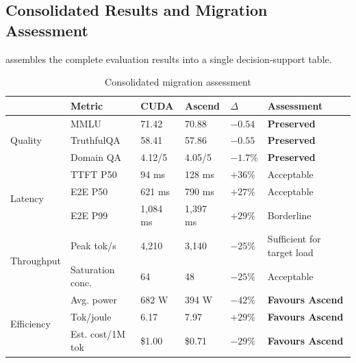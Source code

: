 \subsection{Consolidated Results and Migration Assessment}
\label{subsec:consolidated-results}


 assembles the complete evaluation
results into a single decision-support table.

\begin{table}[htbp]
  \centering
  \caption{Consolidated migration assessment}
  \label{tab:consolidated-verdict}
  \begin{tabularx}{\textwidth}{llXXlX}
    \toprule
    \tableheader{Dimension & Metric & CUDA & Ascend & $\Delta$ & Assessment} \\
    \midrule
    \multirow{3}{*}{Quality}
      & MMLU & 71.42 & 70.88 & $-0.54$ & \textcolor{SecondaryRed}{\bfseries Preserved} \\
      & TruthfulQA & 58.41 & 57.86 & $-0.55$ & \textcolor{SecondaryRed}{\bfseries Preserved} \\
      & Domain QA & 4.12/5 & 4.05/5 & $-1.7\%$ & \textcolor{SecondaryRed}{\bfseries Preserved} \\
    \midrule
    \multirow{3}{*}{Latency}
      & TTFT P50 & 94 ms & 128 ms & $+36\%$ & Acceptable \\
      & E2E P50 & 621 ms & 790 ms & $+27\%$ & Acceptable \\
      & E2E P99 & 1,084 ms & 1,397 ms & $+29\%$ & Borderline \\
    \midrule
    \multirow{2}{*}{Throughput}
      & Peak tok/s & 4,210 & 3,140 & $-25\%$ & Sufficient for target load \\
      & Saturation conc. & 64 & 48 & $-25\%$ & Acceptable \\
    \midrule
    \multirow{3}{*}{Efficiency}
      & Avg. power & 682 W & 394 W & $-42\%$ & \textcolor{SecondaryRed}{\bfseries Favours Ascend} \\
      & Tok/joule & 6.17 & 7.97 & $+29\%$ & \textcolor{SecondaryRed}{\bfseries Favours Ascend} \\
      & Est. cost/1M tok & \$1.00 & \$0.71 & $-29\%$ & \textcolor{SecondaryRed}{\bfseries Favours Ascend} \\
    \bottomrule
  \end{tabularx}
\end{table}

